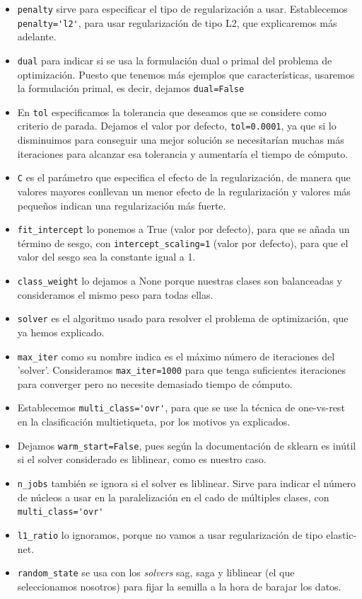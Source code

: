 \documentclass[a4]{article}
\begin{document}
\begin{itemize}
	\item \lstinline|penalty| sirve para especificar el tipo de regularización a usar. Establecemos  \lstinline|penalty='l2'|, para usar regularización de tipo L2, que explicaremos más adelante.
	\item \lstinline|dual| para indicar si se usa la formulación dual o primal del problema de optimización. Puesto que tenemos más ejemplos que características, usaremos la formulación primal, es decir, dejamos \lstinline|dual=False|
	\item En \lstinline|tol| especificamos la tolerancia que deseamos que se considere como criterio de parada. Dejamos el valor por defecto, \lstinline|tol=0.0001|, ya que si lo disminuimos para conseguir una mejor solución se necesitarían muchas más iteraciones para alcanzar esa tolerancia y aumentaría el tiempo de cómputo. 
	\item \lstinline|C| es el parámetro que especifica el efecto de la regularización, de manera que valores mayores conllevan un menor efecto de la regularización y valores más pequeños indican una regularización más fuerte. 
	\item \lstinline|fit_intercept| lo ponemos a True (valor por defecto), para que se añada un término de sesgo, con \lstinline|intercept_scaling=1| (valor por defecto), para que el valor del sesgo sea la constante igual a 1.
	\item \lstinline|class_weight| lo dejamos a None porque nuestras clases son balanceadas y consideramos el mismo peso para todas ellas. 
	\item \lstinline|solver| es el algoritmo usado para resolver el problema de optimización, que ya hemos explicado.
	\item \lstinline|max_iter| como su nombre indica es el máximo número de iteraciones del 'solver'. Consideramos \lstinline|max_iter=1000| para que tenga suficientes iteraciones para converger pero no necesite demasiado tiempo de cómputo. 
	\item Establecemos \lstinline|multi_class='ovr'|, para que se use la técnica de one-vs-rest en la clasificación multietiqueta, por los motivos ya explicados.
	\item Dejamos \lstinline|warm_start=False|, pues según la documentación de sklearn es inútil si el solver considerado es liblinear, como es nuestro caso. 
	\item \lstinline|n_jobs| también se ignora si el solver es liblinear. Sirve para indicar el número de núcleos a usar en la paralelización en el cado de múltiples clases, con \lstinline|multi_class='ovr'|
	\item 	\lstinline|l1_ratio| lo ignoramos, porque no vamos a usar regularización de tipo elastic-net. 
	\item  \lstinline|random_state| se usa con los \textit{solvers} sag, saga y liblinear (el que seleccionamos nosotros) para fijar la semilla a la hora de barajar los datos. 
\end{itemize}
\end{document}
